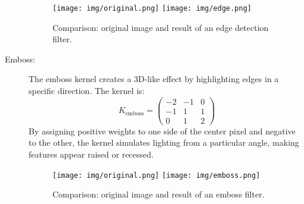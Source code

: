 \documentclass{article}
\begin{document}
\begin{description}
    \begin{figure}[H]
        \centering
        \texttt{[image: img/original.png]}
        \hspace{0.5em}
        \texttt{[image: img/edge.png]}
        \caption{Comparison: original image and result of an edge detection filter.}
        \label{fig:edge_example}
    \end{figure}
    
    \item[Emboss:]
    The emboss kernel creates a 3D-like effect by highlighting edges in a specific direction. The kernel is:
    \[
    K_{\text{emboss}} = \begin{pmatrix} -2 & -1 & 0 \\ -1 & 1 & 1 \\ 0 & 1 & 2 \end{pmatrix}
    \]
    By assigning positive weights to one side of the center pixel and negative to the other, the kernel simulates lighting from a particular angle, making features appear raised or recessed.

    \begin{figure}[H]
        \centering
        \texttt{[image: img/original.png]}
        \hspace{0.5em}
        \texttt{[image: img/emboss.png]}
        \caption{Comparison: original image and result of an emboss filter.}
        \label{fig:emboss_example}
    \end{figure}
\end{description}

\end{document}
